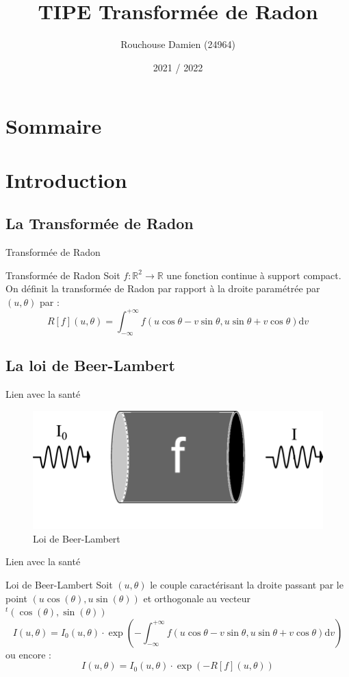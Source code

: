\documentclass{beamer}
\title{TIPE Transformée de Radon}
\author{Rouchouse Damien (24964)}
\date{2021 / 2022}
\newcommand*{\R}{\mathbb{R}}
\newcommand*{\dd}[1]{\mathrm{d}#1}
\begin{document}
\frame{\titlepage}
\section*{Sommaire}
\begin{frame}
    \tableofcontents[hideallsubsections]
\end{frame}

\section{Introduction}
\subsection{La Transformée de Radon}
\begin{frame}{Transformée de Radon}
    \begin{beamerboxesrounded}{Transformée de Radon}
    Soit $f : \R^2 \longrightarrow \R$ une fonction continue à support compact. On définit la transformée de Radon par rapport à la droite paramétrée par $(u, \theta)$ par : 
    $$R[f](u,\theta) = \int_{-\infty}^{+\infty} f(u \cos{\theta} - v \sin{\theta}, u \sin{\theta} + v \cos{\theta}) \dd v $$
    \end{beamerboxesrounded}
\end{frame}
\subsection{La loi de Beer-Lambert}
\begin{frame}{Lien avec la santé}
    \begin{figure}
        \centering
        \includegraphics[scale = 0.4]{loiBeerLambert.png}
        \caption{Loi de Beer-Lambert}
    \end{figure}
\end{frame}

\begin{frame}{Lien avec la santé}
    \begin{beamerboxesrounded}{Loi de Beer-Lambert}
    Soit $(u, \theta)$ le couple caractérisant la droite passant par le point $(u \cos(\theta), u \sin(\theta))$ et orthogonale au vecteur $^t (\cos(\theta), \sin(\theta))$
    $$I(u,\theta) = I_0(u,\theta) \cdot \exp\left({- \int_{-\infty}^{+\infty} f(u \cos{\theta} - v \sin{\theta}, u \sin{\theta} + v \cos{\theta}) \dd v}\right)$$
    \pause
    ou encore : 
    $$I(u,\theta) = I_0(u,\theta) \cdot \exp\left(-R[f](u,\theta)\right)$$
    \end{beamerboxesrounded}
    
\end{frame}
\end{document}
